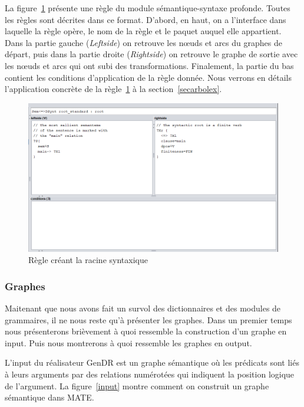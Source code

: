 La figure~\ref{fig:root} présente une règle du module sémantique-syntaxe profonde. Toutes les règles sont décrites dans ce format. D'abord, en haut, on a l'interface dans laquelle la règle opère, le nom de la règle et le paquet auquel elle appartient. Dans la partie gauche (\emph{Leftside}) on retrouve les n\oe{}uds et arcs du graphes de départ, puis dans la partie droite (\emph{Rightside}) on retrouve le graphe de sortie avec les n\oe{}uds et arcs qui ont subi des transformations. Finalement, la partie du bas contient les conditions d'application de la règle donnée. Nous verrons en détails l'application concrète de la règle~\ref{fig:root} à la section~\ref{secarbolex}.

\begin{figure}[htb]
	\centering
	\includegraphics[width=1\textwidth, trim = {0cm 0cm 0cm 0cm},clip]{ch3/figs/grammaire.png}
	\caption{Règle créant la racine syntaxique}
	\label{fig:root}
\end{figure}


\subsubsection{Graphes}\label{entree-sortie}

Maitenant que nous avons fait un survol des dictionnaires et des modules de grammaires, il ne nous reste qu'à présenter les graphes. Dans un premier temps nous présenterons brièvement à quoi ressemble la construction d'un graphe en input. Puis nous montrerons à quoi ressemble les graphes en output.

L'input du réalisateur GenDR est un graphe sémantique \citep{mel2012semantics} où les prédicats sont liés à leurs arguments par des relations numérotées qui indiquent la position logique de l'argument. La figure~\ref{input} montre comment on construit un graphe sémantique dans MATE.

